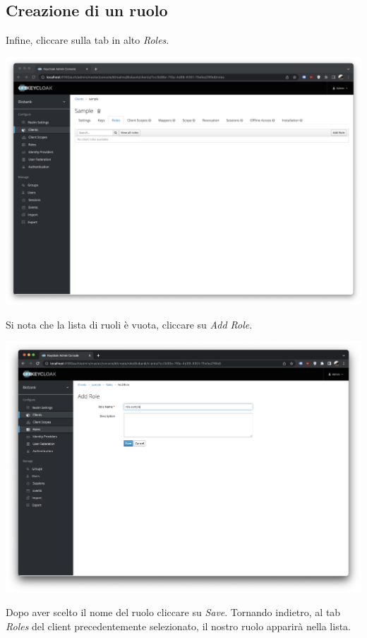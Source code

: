 \documentclass{article}
\begin{document}
\subsection{Creazione di un ruolo}

Infine, cliccare sulla tab in alto \textit{Roles}.

\begin{center}
    \includegraphics[width=0.80\linewidth]{keycloak_08.png}
\end{center}

Si nota che la lista di ruoli è vuota, cliccare su \textit{Add Role}.

\begin{center}
    \includegraphics[width=0.80\linewidth]{keycloak_09.png}
\end{center}

Dopo aver scelto il nome del ruolo cliccare su \textit{Save}. Tornando indietro, al tab \textit{Roles} del client precedentemente selezionato, il nostro ruolo apparirà nella lista.
\end{document}
